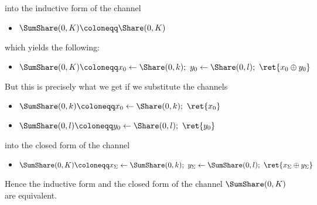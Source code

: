 \begin{itemize}
\begin{itemize}
\end{itemize}
into the inductive form of the channel
\begin{itemize}
\item $\SumShare(0,K) \coloneqq \Share(0,K)$
\end{itemize}
which yields the following:
\begin{itemize}
\item $\SumShare(0,K) \coloneqq x_0 \leftarrow \Share(0,k); \ y_0 \leftarrow \Share(0,l); \ \ret{x_0 \oplus y_0}$
\end{itemize}
But this is precisely what we get if we substitute the channels
\begin{itemize}
\item $\SumShare(0,k) \coloneqq x_0 \leftarrow \Share(0,k); \ \ret{x_0}$
\item $\SumShare(0,l) \coloneqq y_0 \leftarrow \Share(0,l); \ \ret{y_0}$
\end{itemize}
into the closed form of the channel
\begin{itemize}
\item $\SumShare(0,K) \coloneqq x_\Sigma \leftarrow \SumShare(0,k); \ y_\Sigma \leftarrow \SumShare(0,l); \ \ret{x_\Sigma \oplus y_\Sigma}$
\end{itemize}
Hence the inductive form and the closed form of the channel $\SumShare(0,K)$ are equivalent.


\end{itemize}
